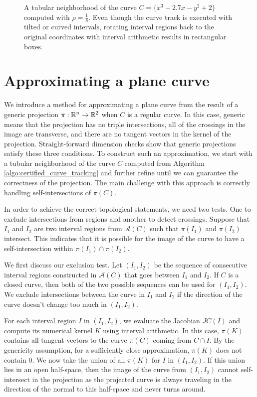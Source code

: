 \begin{figure}[h]
    \centering
    
    \caption{A tubular neighborhood of the curve $C=\{x^3-2.7x-y^2+2\}$ computed with $\rho = \frac{1}{8}$.  Even though the curve track is executed with tilted or curved intervals, rotating interval regions back to the original coordinates with interval arithmetic results in rectangular boxes.}
    \label{fig:tubular_nbd}
\end{figure}


\section{Approximating a plane curve}\label{sec:approximation}

We introduce a method for approximating a plane curve from the result of a generic projection $\pi : {\mathbb R}^n \to {\mathbb R}^2$ when $C$ is a regular curve.  In this case, generic means that the projection has no triple intersections, all of the crossings in the image are transverse, and there are no tangent vectors in the kernel of the projection.  Straight-forward dimension checks show that generic projections satisfy these three conditions.  To construct such an approximation, we start with a tubular neighborhood of the curve $C$ computed from Algorithm \ref{algo:certified_curve_tracking} and further refine until we can guarantee the correctness of the projection.  The main challenge with this approach is correctly handling self-intersections of $\pi(C).$

In order to achieve the correct topological statements, we need two tests.  One to exclude intersections from regions and another to detect crossings.  Suppose that $I_1$ and $I_2$ are two interval regions from $\mathcal{A}(C)$ such that $\pi(I_1)$ and $\pi(I_2)$ intersect.  This indicates that it is possible for the image of the curve to have a self-intersection within $\pi(I_1)\cap\pi(I_2)$.

We first discuss our exclusion test.  Let $(I_1,I_2)$ be the sequence of consecutive interval regions constructed in $\mathcal{A}(C)$ that goes between $I_1$ and $I_2$.  If $C$ is a closed curve, then both of the two possible sequences can be used for $(I_1,I_2)$.  We exclude intersections between the curve in $I_1$ and $I_2$ if the direction of the curve doesn't change too much in $(I_1,I_2)$.

For each interval region $I$ in $(I_1,I_2)$, we evaluate the Jacobian $JC(I)$ and compute its numerical kernel $K$ using interval arithmetic.  In this case, $\pi(K)$ contains all tangent vectors to the curve $\pi(C)$ coming from $C\cap I$.  By the genericity assumption, for a sufficiently close approximation, $\pi(K)$ does not contain $0$.  We now take the union of all $\pi(K)$ for $I$ in $(I_1,I_2)$.  If this union lies in an open half-space, then the image of the curve from $(I_1,I_2)$ cannot self-intersect in the projection as the projected curve is always traveling in the direction of the normal to this half-space and never turns around.

